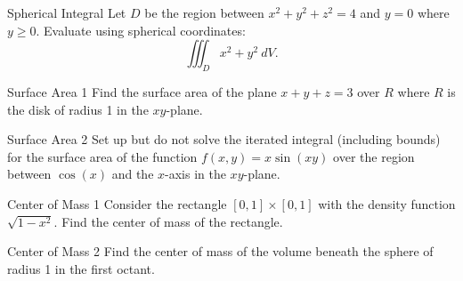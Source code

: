 \begin{pexercise}{Spherical Integral}
Let $D$ be the region between $x^2+y^2+z^2=4$ and $y=0$ where $y\geq 0$. Evaluate using spherical coordinates: $$\iiint_D x^2+y^2 \ dV .$$
\end{pexercise}

\begin{exercise}{Surface Area 1}
Find the surface area of the plane $x+y+z=3$ over $R$ where $R$ is the disk of radius 1 in the $xy$-plane.
\end{exercise}

\begin{exercise}{Surface Area 2}
Set up but do not solve the iterated integral (including bounds) for the surface area of the function $f(x,y)=x\sin(xy)$ over the region between $\cos(x)$ and the $x$-axis in the $xy$-plane.
\end{exercise}

\begin{exercise}{Center of Mass 1}
Consider the rectangle $[0,1]\times[0,1]$ with the density function $\sqrt{1-x^2}$. Find the center of mass of the rectangle.
\end{exercise}

\begin{exercise}{Center of Mass 2}
Find the center of mass of the volume beneath the sphere of radius 1 in the first octant.
\end{exercise}
\renewcommand\thesubsection{\thesection.\arabic{subsection}}